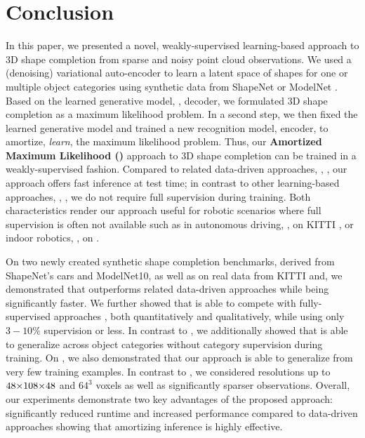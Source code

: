 \section{Conclusion}
\label{sec:conclusion}

In this paper, we presented a novel, weakly-supervised learning-based approach to 3D shape completion from sparse and noisy point cloud observations. We used a (denoising) variational auto-encoder \citep{Kingma2014ICLR,Im2017AAAI} to learn a latent space of shapes for one or multiple object categories using synthetic data from ShapeNet \citep{Chang2015ARXIV} or ModelNet \citep{Wu2015CVPR}. Based on the learned generative model, \ie, decoder, we formulated 3D shape completion as a maximum likelihood problem. In a second step, we then fixed the learned generative model and trained a new recognition model, \ie encoder, to amortize, \ie \emph{learn}, the maximum likelihood problem. Thus, our {\bf Amortized Maximum Likelihood (\AML)} approach to 3D shape completion can be trained in a weakly-supervised fashion. Compared to related data-driven approaches, \eg, \citep{Rock2015CVPR,Haene2014CVPR,Li2015CGF,Engelmann2016GCPR,Engelmann2017WACV,Nan2012TG,Bao2013CVPR,Dame2013CVPR,Ngyuen2016CVPR}, our approach offers fast inference at test time; in contrast to other learning-based approaches, \eg, \citep{Riegler2017THREEDV,Smith2017ARXIV,Dai2017CVPRa,Sharma2016ARXIV,Fan2017CVPR,Rezende2016ARXIV,Yang2018ARXIVb,Wang2017ICCV,Varley2017IROS,Han2017ICCV}, we do not require full supervision during training. Both characteristics render our approach useful for robotic scenarios where full supervision is often not available such as in autonomous driving, \eg, on KITTI \citep{Geiger2012CVPR}, or indoor robotics, \eg, on \Kinect \citep{Yang2018ARXIVb}.

On two newly created synthetic shape completion benchmarks, derived from ShapeNet's cars and ModelNet10, as well as on real data from KITTI and, we demonstrated that \AML outperforms related data-driven approaches \citep{Engelmann2016GCPR,Gupta2015CVPR} while being significantly faster. We further showed that \AML is able to compete with fully-supervised approaches \citep{Dai2017CVPRa}, both quantitatively and qualitatively, while using only $3-10\%$ supervision or less. In contrast to \citep{Rock2015CVPR,Haene2014CVPR,Li2015CGF,Engelmann2016GCPR,Engelmann2017WACV,Nan2012TG,Bao2013CVPR,Dame2013CVPR}, we additionally showed that \AML is able to generalize across object categories without category supervision during training. On \Kinect, we also demonstrated that our \AML approach is able to generalize from very few training examples. In contrast to \citep{Girdhar2016ECCV,Liu2017ARXIV,Sharma2016ARXIV,Wu2015CVPR,Dai2017CVPRa,Firman2016CVPR,Han2017ICCV,Fan2017CVPR}, we considered resolutions up to $48 \operatorname*{\!\times\!} 108 \operatorname*{\!\times\!} 48$ and $64^3$ voxels as well as significantly sparser observations. Overall, our experiments demonstrate two key advantages of the proposed approach: significantly reduced runtime and increased performance compared to data-driven approaches showing that amortizing inference is highly effective.

